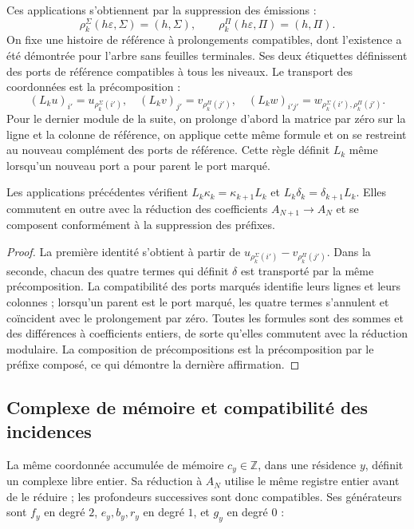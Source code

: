Ces applications s'obtiennent par la suppression des émissions :
\[
\rho_k^\Sigma(h\varepsilon,\Sigma)=(h,\Sigma),\qquad
\rho_k^\Pi(h\varepsilon,\Pi)=(h,\Pi).
\]
On fixe une histoire de référence à prolongements compatibles, dont l'existence a été démontrée pour l'arbre sans feuilles terminales. Ses deux étiquettes définissent des ports de référence compatibles à tous les niveaux. Le transport des coordonnées est la précomposition :
\[
(L_ku)_{i'}=u_{\rho_k^\Sigma(i')},\quad
(L_kv)_{j'}=v_{\rho_k^\Pi(j')},\quad
(L_kw)_{i'j'}=w_{\rho_k^\Sigma(i'),\rho_k^\Pi(j')}.
\]
Pour le dernier module de la suite, on prolonge d’abord la matrice par zéro sur la ligne et la colonne de référence, on applique cette même formule et on se restreint au nouveau complément des ports de référence. Cette règle définit \(L_k\) même lorsqu’un nouveau port a pour parent le port marqué.

\begin{proposition}
\label{x_reciprocidad:iv:rectangular-natural}
Les applications précédentes vérifient
\(L_k\kappa_k=\kappa_{k+1}L_k\) et
\(L_k\delta_k=\delta_{k+1}L_k\).
Elles commutent en outre avec la réduction des coefficients
\(A_{N+1}\to A_N\) et se composent conformément à la suppression des préfixes.
\end{proposition}
\begin{proof}
La première identité s'obtient à partir de \(u_{\rho_k^\Sigma(i')}-v_{\rho_k^\Pi(j')}\). Dans la seconde, chacun des quatre termes qui définit \(\delta\) est transporté par la même précomposition. La compatibilité des ports marqués identifie leurs lignes et leurs colonnes ; lorsqu'un parent est le port marqué, les quatre termes s'annulent et coïncident avec le prolongement par zéro. Toutes les formules sont des sommes et des différences à coefficients entiers, de sorte qu'elles commutent avec la réduction modulaire. La composition de précompositions est la précomposition par le préfixe composé, ce qui démontre la dernière affirmation.
\end{proof}

\subsection{Complexe de mémoire et compatibilité des incidences}
\label{x_reciprocidad:iv:cont:memoria}
La même coordonnée accumulée de mémoire \(c_y\in\mathbb Z\), dans une résidence \(y\), définit un complexe libre entier. Sa réduction à \(A_N\) utilise le même registre entier avant de le réduire ; les profondeurs successives sont donc compatibles. Ses générateurs sont \(f_y\) en degré \(2\), \(e_y,b_y,r_y\) en degré \(1\), et \(g_y\) en degré \(0\) :

